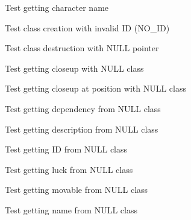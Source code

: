 \begin{DoxyRefList}
Test getting character name  
\item[Global \doxylink{class__test_8c_ae31b72631da3e14bf1ba3910a097a097}{test2\+\_\+class\+\_\+create} ()]\label{test__test000025}%
%
Test class creation with invalid ID (NO\+\_\+\+ID)  
\item[Global \doxylink{class__test_8c_ae6a94be0e30677059a7e5ed56fd7543b}{test2\+\_\+class\+\_\+destroy} ()]\label{test__test000027}%
%
Test class destruction with NULL pointer  
\item[Global \doxylink{class__test_8c_a82329b99f8f72c83d327c3610a016d78}{test2\+\_\+class\+\_\+get\+\_\+closeup} ()]\label{test__test000047}%
%
Test getting closeup with NULL class  
\item[Global \doxylink{class__test_8c_a2cda1c67467b8faac47e5a07ed4f3239}{test2\+\_\+class\+\_\+get\+\_\+closeup\+\_\+at\+\_\+pos} ()]\label{test__test000045}%
%
Test getting closeup at position with NULL class  
\item[Global \doxylink{class__test_8c_a62805d48b0ea02b7334d27a1244bfe3c}{test2\+\_\+class\+\_\+get\+\_\+dependency} ()]\label{test__test000055}%
%
Test getting dependency from NULL class  
\item[Global \doxylink{class__test_8c_a7ddc57121cc9d0a5a1f0f76b9d83a177}{test2\+\_\+class\+\_\+get\+\_\+desc} ()]\label{test__test000041}%
%
Test getting description from NULL class  
\item[Global \doxylink{class__test_8c_a9bc6a07070f417a9ae0b382aae159740}{test2\+\_\+class\+\_\+get\+\_\+id} ()]\label{test__test000029}%
%
Test getting ID from NULL class  
\item[Global \doxylink{class__test_8c_a45ba5b97677a5e97a4e849c924e41b19}{test2\+\_\+class\+\_\+get\+\_\+luck} ()]\label{test__test000063}%
%
Test getting luck from NULL class  
\item[Global \doxylink{class__test_8c_acd32c676b0a721e1029cccfcf1fb8d41}{test2\+\_\+class\+\_\+get\+\_\+movable} ()]\label{test__test000051}%
%
Test getting movable from NULL class  
\item[Global \doxylink{class__test_8c_aa1c51f2ece711e493f16b64e93b2d110}{test2\+\_\+class\+\_\+get\+\_\+name} ()]\label{test__test000037}%
%
Test getting name from NULL class  
\item[Global \doxylink{class__test_8c_af8bea81e1d23f8826ed3a5cf8a1517b5}{test2\+\_\+class\+\_\+get\+\_\+open} ()]\label{test__test000059}%

\end{DoxyRefList}
